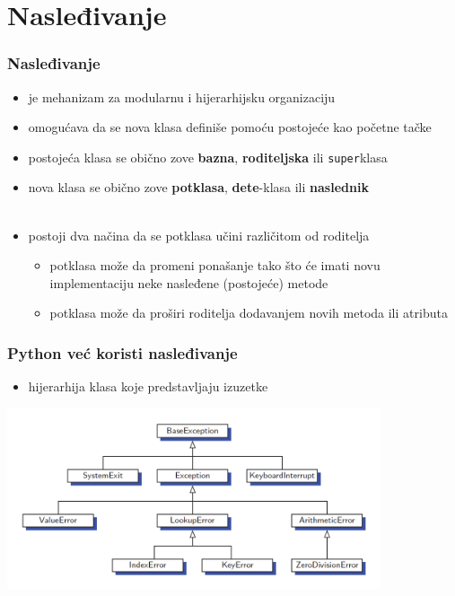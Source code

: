 \documentclass[compress]{beamer}
\begin{document}
\section[Nasleđivanje]{Nasleđivanje}
\begin{frame}[fragile]
  \frametitle{Nasleđivanje}
  \begin{itemize}
    \item {} je mehanizam za modularnu i hijerarhijsku organizaciju
    \item omogućava da se nova klasa definiše pomoću postojeće kao početne tačke
    \item postojeća klasa se obično zove \textbf{bazna}, \textbf{roditeljska} ili \texttt{super}klasa
    \item nova klasa se obično zove \textbf{potklasa}, \textbf{dete}-klasa ili \textbf{naslednik} \\ \\
    \item postoji dva načina da se potklasa učini različitom od roditelja
    \begin{itemize}
      \item potklasa može da promeni ponašanje tako što će imati novu implementaciju neke nasleđene (postojeće) metode
      \item potklasa može da proširi roditelja dodavanjem novih metoda ili atributa
    \end{itemize}
  \end{itemize}
\end{frame}

\begin{frame}[fragile]
  \frametitle{Python već koristi nasleđivanje}
  \begin{itemize}
    \item hijerarhija klasa koje predstavljaju izuzetke
  \end{itemize}
  \begin{center}
    \includegraphics[width=11cm]{asp-03-pic04.png}
  \end{center}
\end{frame}
\end{document}
